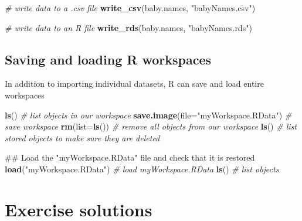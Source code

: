 \documentclass[]{book}
\newenvironment{Shaded}{\begin{snugshade}}{\end{snugshade}}
\newcommand{\KeywordTok}[1]{\textcolor[rgb]{0.13,0.29,0.53}{\textbf{#1}}}
\newcommand{\DataTypeTok}[1]{\textcolor[rgb]{0.13,0.29,0.53}{#1}}
\newcommand{\StringTok}[1]{\textcolor[rgb]{0.31,0.60,0.02}{#1}}
\newcommand{\CommentTok}[1]{\textcolor[rgb]{0.56,0.35,0.01}{\textit{#1}}}
\newcommand{\NormalTok}[1]{#1}
\begin{document}
\begin{Shaded}
\begin{Highlighting}[]
\CommentTok{# write data to a .csv file}
\KeywordTok{write_csv}\NormalTok{(baby.names, }\StringTok{"babyNames.csv"}\NormalTok{)}
\end{Highlighting}
\end{Shaded}

\begin{Shaded}
\begin{Highlighting}[]
\CommentTok{# write data to an R file}
\KeywordTok{write_rds}\NormalTok{(baby.names, }\StringTok{"babyNames.rds"}\NormalTok{)}
\end{Highlighting}
\end{Shaded}

\subsection{Saving and loading R
workspaces}\label{saving-and-loading-r-workspaces}

In addition to importing individual datasets, R can save and load entire
workspaces

\begin{Shaded}
\begin{Highlighting}[]
\KeywordTok{ls}\NormalTok{() }\CommentTok{# list objects in our workspace}
\KeywordTok{save.image}\NormalTok{(}\DataTypeTok{file=}\StringTok{"myWorkspace.RData"}\NormalTok{) }\CommentTok{# save workspace }
\KeywordTok{rm}\NormalTok{(}\DataTypeTok{list=}\KeywordTok{ls}\NormalTok{()) }\CommentTok{# remove all objects from our workspace }
\KeywordTok{ls}\NormalTok{() }\CommentTok{# list stored objects to make sure they are deleted}
\end{Highlighting}
\end{Shaded}

\begin{Shaded}
\begin{Highlighting}[]
\NormalTok{## Load the "myWorkspace.RData" file and check that it is restored}
\KeywordTok{load}\NormalTok{(}\StringTok{"myWorkspace.RData"}\NormalTok{) }\CommentTok{# load myWorkspace.RData}
\KeywordTok{ls}\NormalTok{() }\CommentTok{# list objects}
\end{Highlighting}
\end{Shaded}

\section{Exercise solutions}\label{exercise-solutions}
\end{document}
